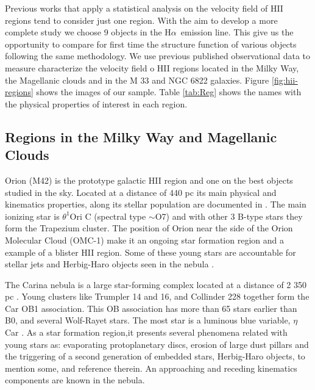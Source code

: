 \documentclass[fleqn,usenatbib, useAMS, a4paper]{mnras}
\newcommand\halpha{H${\alpha}$}
\begin{document}
Previous works that apply a statistical analysis on the velocity field of HII regions  
tend to consider just one region.
With the aim to develop a more complete study we choose 9 objects in the \halpha\ emission line.
This give us the opportunity to compare for first time the structure function of various objects following the same methodology.
We use previous published observational data to measure characterize the velocity field o HII regions located in the Milky Way, the Magellanic clouds and in the M 33 and NGC 6822 galaxies. 
Figure \ref{fig:hii-regions} shows the images of our sample.
Table \ref{tab:Reg} shows the names with the physical properties of interest in each region. 

\subsection{Regions in the Milky Way and Magellanic Clouds}
\label{sec:regions-milky-way}

Orion (M42) is the prototype galactic HII region and one on the best objects studied in the sky.
Located at a distance of 440 pc \citep{2008AJ....136.1566O} its main physical and kinematics properties, along its stellar population are documented in \citet{2001ARA&A..39...99O}.
The main ionizing star is \(\theta^{1}\)Ori C (spectral type \(\sim\)O7) and with other 3 B-type stars they form the Trapezium cluster.
The position of Orion near the side of the Orion Molecular Cloud (OMC-1) make it an ongoing star formation region and a example of a blister HII region. Some of these young stars are accountable for stellar jets and Herbig-Haro objects seen in the nebula \citep{arthur2016turbulence}.

The Carina nebula is a large star-forming complex located at a distance of 2 350 pc \citep{2006ApJ...644.1151S}.
Young clusters like Trumpler 14 and 16, and Collinder 228 together form the Car OB1 association.
This OB association has more than 65 stars earlier than B0, and several Wolf-Rayet stars.
The most star is a luminous blue variable, $\eta$ Car \citep{Damiani:2016a}.
As a star formation region,it presents several phenomena related with young stars as: evaporating protoplanetary discs, erosion of large dust pillars and the triggering of a second generation of embedded stars, Herbig-Haro objects, to mention some, \citet{2008hsf2.book..138S} and reference therein.
An approaching and receding kinematics components are known in the nebula.
\end{document}
